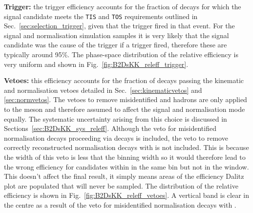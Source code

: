 \begin{description}
\item \textbf{Trigger:} the trigger efficiency accounts for the fraction of decays for which the signal candidate meets the \texttt{TIS} and \texttt{TOS} requirements outlined in Sec.~\ref{sec:selection_trigger}, given that the trigger fired in that event. For the signal and normalisation simulation samples it is very likely that the signal candidate was the cause of the trigger if a trigger fired, therefore these are typically around 95\%. The phase-space distribution of the relative efficiency is very uniform and shown in Fig.~\ref{fig:B2DsKK_releff_trigger}.
\item \textbf{Vetoes:} this efficiency accounts for the fraction of decays passing the kinematic and normalisation vetoes detailed in Sec.~\ref{sec:kinematicvetos} and \ref{sec:normvetos}. The vetoes to remove misidentified \D and \Lc hadrons are only applied to the \Dsp meson and therefore assumed to affect the signal and normalisation mode equally. The systematic uncertainty arising from this choice is discussed in Sections~\ref{sec:B2DsKK_sys_releff}. Although the veto for misidentified normalisation decays proceeding via \decay{\Dzb}{\Kp\pim} decays is included, the veto to remove correctly reconstructed normalisation decays with \decay{\Dzb}{\Kp\Km} is not included. This is because the width of this veto is less that the binning width so it would therefore lead to the wrong efficiency for candidates within in the same bin but not in the window. This doesn't affect the final result, it simply means areas of the efficiency Dalitz plot are populated that will never be sampled. The distribution of the relative efficiency is shown in Fig.~\ref{fig:B2DsKK_releff_vetoes}. A vertical band is clear in the centre as a result of the veto for misidentified normalisation decays with \decay{\Dzb}{\Kp\pim}.
\end{description}

